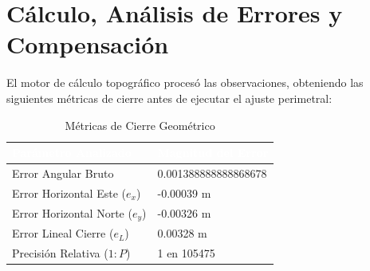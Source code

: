 \documentclass[11pt,letterpaper]{article}
\begin{document}
\section{Cálculo, Análisis de Errores y Compensación}
El motor de cálculo topográfico procesó las observaciones, obteniendo las siguientes métricas de cierre antes de ejecutar el ajuste perimetral:
\begin{table}[H]
  \centering
  \caption{Métricas de Cierre Geométrico}
  \begin{tabular}{|l|l|}
    \hline
    \rowcolor{GeoBlue}
    \textcolor{white}{\textbf{Parámetro Analizado}} & \textcolor{white}{\textbf{Magnitud del Error}} \\
    \hline
    Error Angular Bruto & 0.001388888888868678 \\
    \rowcolor{GeoBlue!5}
    Error Horizontal Este ($e_x$) & -0.00039 m \\
    Error Horizontal Norte ($e_y$) & -0.00326 m \\
    \rowcolor{GeoBlue!5}
    Error Lineal Cierre ($e_L$) & 0.00328 m \\
    Precisión Relativa ($1:P$) & 1 en 105475 \\
    \hline
  \end{tabular}
\end{table}
\end{document}
